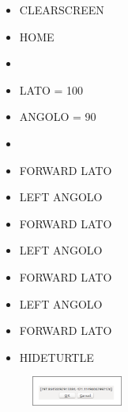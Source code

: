 \vskip 1cm

\begin{scriptsize}
\begin{minipage}{0.40\textwidth}
\begin{itemize}[itemsep=-3pt,parsep=2pt]
\item[] CLEARSCREEN
\item[] HOME
\item[] 
\item[] LATO = 100
\item[] ANGOLO = 90
\item[] 
\item[] FORWARD LATO
\item[] LEFT ANGOLO
\item[] FORWARD LATO
\item[] LEFT ANGOLO
\item[] FORWARD LATO
\item[] LEFT ANGOLO
\item[] FORWARD LATO
\item[] HIDETURTLE    
\end{itemize}
\end{minipage}
\end{scriptsize}
\begin{minipage}{0.4\textwidth}
\begin{figure}[H]
   \includegraphics[width=3.0cm,trim=4 4 8 4,clip]{./images/disegnare/disegnare-28.png}
   \label{dis-27}
\end{figure}
\end{minipage} \hfill

\vskip 1cm

